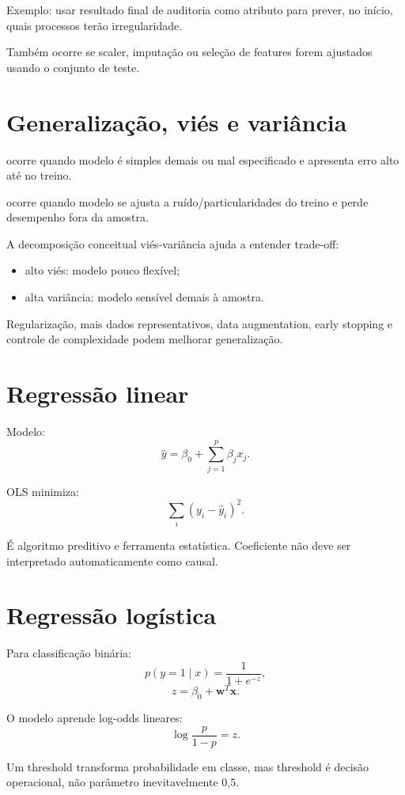Exemplo: usar resultado final de auditoria como atributo para prever, no início, quais processos terão irregularidade.

Também ocorre se scaler, imputação ou seleção de features forem ajustados usando o conjunto de teste.

\section{Generalização, viés e variância}

 ocorre quando modelo é simples demais ou mal especificado e apresenta erro alto até no treino.

 ocorre quando modelo se ajusta a ruído/particularidades do treino e perde desempenho fora da amostra.

A decomposição conceitual viés-variância ajuda a entender trade-off:
\begin{itemize}
\item alto viés: modelo pouco flexível;
\item alta variância: modelo sensível demais à amostra.
\end{itemize}

Regularização, mais dados representativos, data augmentation, early stopping e controle de complexidade podem melhorar generalização.

\section{Regressão linear}

Modelo:
\[
\hat y=\beta_0+\sum_{j=1}^{p}\beta_jx_j.
\]

OLS minimiza:
\[
\sum_i(y_i-\hat y_i)^2.
\]

É algoritmo preditivo e ferramenta estatística. Coeficiente não deve ser interpretado automaticamente como causal.

\section{Regressão logística}

Para classificação binária:
\[
p(y=1\mid x)=\frac{1}{1+e^{-z}},
\]
\[
z=\beta_0+\mathbf{w}^{T}\mathbf{x}.
\]

O modelo aprende log-odds lineares:
\[
\log\frac{p}{1-p}=z.
\]

Um threshold transforma probabilidade em classe, mas threshold é decisão operacional, não parâmetro inevitavelmente 0,5.

